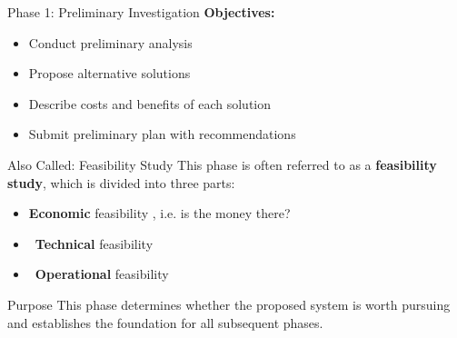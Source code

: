 \documentclass[aspectratio=169]{beamer}
\begin{document}
\begin{frame}{Phase 1: Preliminary Investigation}
    \textbf{Objectives:}
    \begin{itemize}
        \item Conduct preliminary analysis
        \item Propose alternative solutions
        \item Describe costs and benefits of each solution
        \item Submit preliminary plan with recommendations
    \end{itemize}
    
    \vspace{0.1cm}
    \begin{block}{Also Called: Feasibility Study}
        This phase is often referred to as a \textbf{feasibility study}, which is divided into three parts:
        \begin{itemize}
            \item \textbf{Economic} feasibility , i.e. is the money there?
            \item\, \textbf{Technical} feasibility
            \item \faCogs\, \textbf{Operational} feasibility
        \end{itemize}
    \end{block}
    
    \vspace{0.1cm}
    \begin{exampleblock}{Purpose}
        This phase determines whether the proposed system is worth pursuing and establishes the foundation for all subsequent phases.
    \end{exampleblock}
\end{frame}
\end{document}

